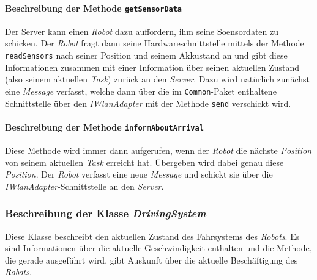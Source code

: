			\paragraph{Beschreibung der Methode \texttt{getSensorData}}
			Der Server kann einen \textit{Robot} dazu auffordern, ihm seine Soensordaten zu schicken. 
			Der \textit{Robot} fragt dann seine Hardwareschnittstelle mittels der Methode \texttt{readSensors} 
			nach seiner Position und seinem Akkustand an und gibt diese Informationen zusammen mit einer Information über seinen aktuellen Zustand (also seinem aktuellen \textit{Task}) zurück an den \textit{Server}. 
			Dazu wird natürlich zunächst eine \textit{Message} verfasst, welche dann über die im \texttt{Common}-Paket enthaltene Schnittstelle über den \textit{IWlanAdapter} mit der Methode \texttt{send} verschickt wird.
			
			\paragraph{Beschreibung der Methode \texttt{informAboutArrival}}
			Diese Methode wird immer dann aufgerufen, wenn der \textit{Robot} die nächste \textit{Position} von seinem aktuellen \textit{Task} erreicht hat. 
			Übergeben wird dabei genau diese \textit{Position}. 
			Der \textit{Robot} verfasst eine neue \textit{Message} und schickt sie über die \textit{IWlanAdapter}-Schnittstelle an den \textit{Server}. 
			
	\subsubsection{Beschreibung der Klasse \textit{DrivingSystem}}
		
		Diese Klasse beschreibt den aktuellen Zustand des Fahrsystems des \textit{Robots}. 
		Es sind Informationen über die aktuelle Geschwindigkeit enthalten und die Methode, 
		die gerade ausgeführt wird, gibt Auskunft über die aktuelle Beschäftigung des \textit{Robots}.

